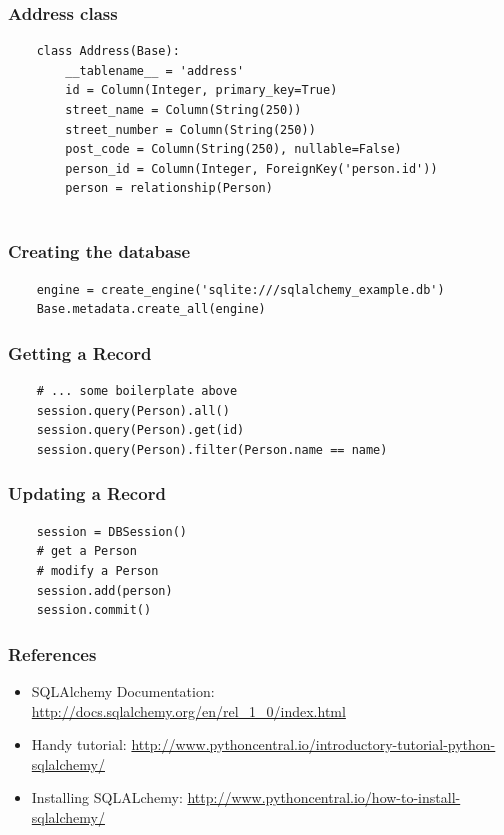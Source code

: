 \documentclass[10pt]{beamer}
\begin{document}
\begin{frame}[fragile]
	\frametitle{Address class}
	\begin{verbatim}
    class Address(Base):
        __tablename__ = 'address'
        id = Column(Integer, primary_key=True)
        street_name = Column(String(250))
        street_number = Column(String(250))
        post_code = Column(String(250), nullable=False)
        person_id = Column(Integer, ForeignKey('person.id'))
        person = relationship(Person)
	
	\end{verbatim}
\end{frame}

\begin{frame}[fragile]
	\frametitle{Creating the database}
	\begin{verbatim}
    engine = create_engine('sqlite:///sqlalchemy_example.db')
    Base.metadata.create_all(engine)
	\end{verbatim}
\end{frame}

\begin{frame}[fragile]
	\frametitle{Getting a Record }
	\begin{verbatim}
	# ... some boilerplate above
	session.query(Person).all()
	session.query(Person).get(id)
	session.query(Person).filter(Person.name == name)
	\end{verbatim}
\end{frame}

\begin{frame}[fragile]
	\frametitle{Updating a Record }
	\begin{verbatim}
	session = DBSession()
	# get a Person
	# modify a Person
	session.add(person)
	session.commit()
	\end{verbatim}

\end{frame}
\begin{frame}
	\frametitle{References}
	
	\begin{itemize}
		\item SQLAlchemy Documentation:
		\url{http://docs.sqlalchemy.org/en/rel_1_0/index.html}
		\item Handy tutorial:
		\url{http://www.pythoncentral.io/introductory-tutorial-python-sqlalchemy/}
		\item Installing SQLALchemy: 
		\url{http://www.pythoncentral.io/how-to-install-sqlalchemy/}
	\end{itemize}
\end{frame}
\end{document}
